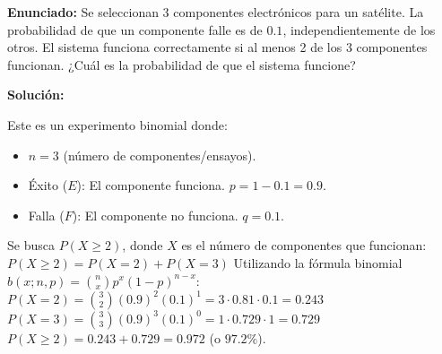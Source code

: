 \documentclass[12pt]{article}
\begin{document}
\textbf{Enunciado:}
Se seleccionan 3 componentes electrónicos para un satélite. La probabilidad de que un componente falle es de $0.1$, independientemente de los otros. El sistema funciona correctamente si al menos 2 de los 3 componentes funcionan. ¿Cuál es la probabilidad de que el sistema funcione?

\textbf{Solución:}

Este es un experimento binomial donde:
\begin{itemize}
    \item $n = 3$ (número de componentes/ensayos).
    \item Éxito ($E$): El componente funciona. $p = 1 - 0.1 = 0.9$.
    \item Falla ($F$): El componente no funciona. $q = 0.1$.
\end{itemize}

Se busca $P(X \ge 2)$, donde $X$ es el número de componentes que funcionan:
$P(X \ge 2) = P(X=2) + P(X=3)$
Utilizando la fórmula binomial $b(x; n, p) = \binom{n}{x} p^x (1-p)^{n-x}$:
$P(X=2) = \binom{3}{2} (0.9)^2 (0.1)^1 = 3 \cdot 0.81 \cdot 0.1 = 0.243$
$P(X=3) = \binom{3}{3} (0.9)^3 (0.1)^0 = 1 \cdot 0.729 \cdot 1 = 0.729$
$P(X \ge 2) = 0.243 + 0.729 = \mathbf{0.972}$ (o $97.2\%$).
\end{document}
